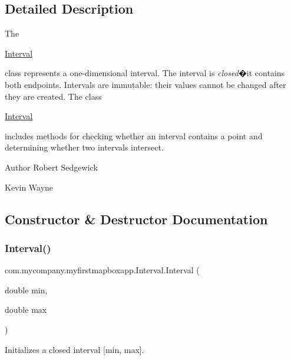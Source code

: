 \subsection{Detailed Description}
The
\begin{DoxyCode}
\hyperlink{classcom_1_1mycompany_1_1myfirstmapboxapp_1_1_interval_a2eccdd083583a2babcfea22b5a0f8053}{Interval} 
\end{DoxyCode}
 class represents a one-\/dimensional interval. The interval is {\itshape closed}�it contains both endpoints. Intervals are immutable\+: their values cannot be changed after they are created. The class
\begin{DoxyCode}
\hyperlink{classcom_1_1mycompany_1_1myfirstmapboxapp_1_1_interval_a2eccdd083583a2babcfea22b5a0f8053}{Interval} 
\end{DoxyCode}
 includes methods for checking whether an interval contains a point and determining whether two intervals intersect.

\begin{DoxyAuthor}{Author}
Robert Sedgewick 

Kevin Wayne 
\end{DoxyAuthor}


\subsection{Constructor \& Destructor Documentation}
\mbox{\label{classcom_1_1mycompany_1_1myfirstmapboxapp_1_1_interval_a2eccdd083583a2babcfea22b5a0f8053}} 
\subsubsection{\texorpdfstring{Interval()}{Interval()}}
{\footnotesize\ttfamily com.\+mycompany.\+myfirstmapboxapp.\+Interval.\+Interval (\begin{DoxyParamCaption}\item[{double}]{min,  }\item[{double}]{max }\end{DoxyParamCaption})\hspace{0.3cm}{\ttfamily [inline]}}

Initializes a closed interval \mbox{[}min, max\mbox{]}.


